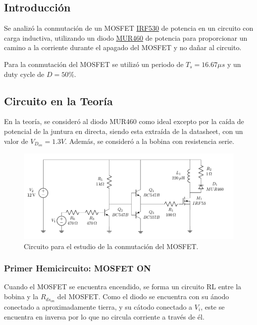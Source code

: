 



\subsection{Introducción}

Se analizó la conmutación de un MOSFET \href{https://www.vishay.com/docs/91019/91019.pdf}{IRF530} de potencia en un circuito con carga inductiva, utilizando un diodo \href{https://www.onsemi.com/pdf/datasheet/mur420-d.pdf}{MUR460} de potencia para proporcionar un camino a la corriente durante el apagado del MOSFET y no dañar al circuito.


Para la conmutación del MOSFET se utilizó un periodo de $T_s = 16.67 \mu s$ y un duty cycle de $D = 50 \%$.

\subsection{Circuito en la Teoría}

En la teoría, se consideró al diodo MUR460 como ideal excepto por la caída de potencial de la juntura en directa, siendo esta extraída de la datasheet, con un valor de $V_{D_{on}} = 1.3V$. Además, se consideró a la bobina con resistencia serie.

\begin{figure}[H]
	\centering
	\includegraphics[width=0.7\linewidth, page=1]{ImagenesEjercicio-1/CircuitsEj1}
	\caption{Circuito para el estudio de la conmutación del MOSFET.}
	\label{ej1:fig:circuito}
\end{figure}

\subsubsection{Primer Hemicircuito: MOSFET ON}

Cuando el MOSFET se encuentra encendido, se forma un circuito RL entre la bobina y la $R_{ds_{on}}$ del MOSFET. Como el diodo se encuentra con su ánodo conectado a aproximadamente tierra, y su cátodo conectado a $V_i$, este se encuentra en inversa por lo que no circula corriente a través de él.

